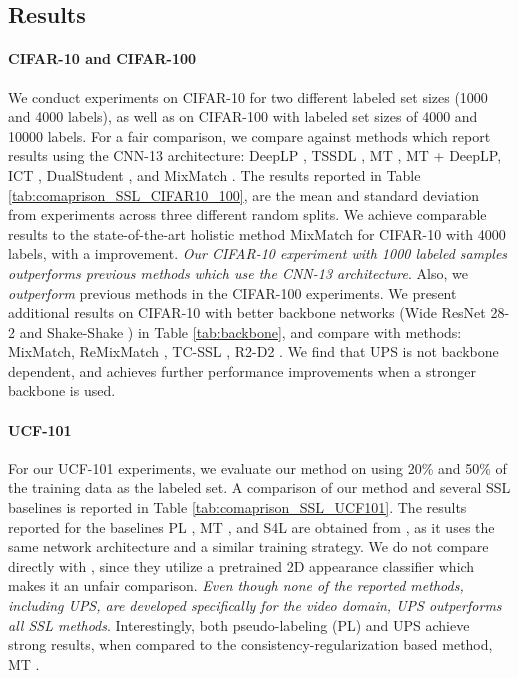 \documentclass{article} \usepackage{iclr2021_conference,times}
\begin{document}
\subsection{Results}

\paragraph{CIFAR-10 and CIFAR-100}
We conduct experiments on CIFAR-10 for two different labeled set sizes (1000 and 4000 labels), as well as on CIFAR-100 with labeled set sizes of 4000 and 10000 labels. For a fair comparison, we compare against methods which report results using the CNN-13 architecture: DeepLP \citep{Iscen2019LabelPF}, TSSDL \citep{Shi_2018_ECCV}, MT \citep{NIPS2017_6719_meanT}, MT + DeepLP, ICT \citep{Verma2019InterpolationCT}, DualStudent \citep{Ke_2019_ICCV}, and MixMatch \citep{NIPS2019_8749_MixMatch}. The results reported in Table \ref{tab:comaprison_SSL_CIFAR10_100}, are the mean and standard deviation from experiments across three different random splits. We achieve comparable results to the state-of-the-art holistic method MixMatch \citep{NIPS2019_8749_MixMatch} for CIFAR-10 with 4000 labels, with a  improvement. {\em Our CIFAR-10 experiment with 1000 labeled samples outperforms previous methods which use the CNN-13 architecture}. Also, we {\em outperform} previous methods in the CIFAR-100 experiments. We present additional results on CIFAR-10 with better backbone networks (Wide ResNet 28-2 \citep{BMVC2016_87} and Shake-Shake \citep{gastaldi2017shake}) in Table \ref{tab:backbone}, and compare with methods: MixMatch, ReMixMatch \citep{Berthelot2020ReMixMatch:}, TC-SSL \citep{zhoutime}, R2-D2 \citep{R2D2_AAAI_2020}. We find that UPS is not backbone dependent, and achieves further performance improvements when a stronger backbone is used.






\paragraph{UCF-101} 
For our UCF-101 experiments, we evaluate our method on using 20\% and 50\% of the training data as the labeled set. A comparison of our method and several SSL baselines is reported in Table \ref{tab:comaprison_SSL_UCF101}. The results reported for the baselines PL \citep{Lee2013PseudoLabelT}, MT \citep{NIPS2017_6719_meanT}, and S4L \citep{zhai2019s4l} are obtained from \citep{jing2020videossl}, as it uses the same network architecture and a similar training strategy. We do not compare directly with \citep{jing2020videossl}, since  they utilize a pretrained 2D appearance classifier which makes it an unfair comparison. {\em Even though none of the reported methods, including UPS, are developed specifically for the video domain, UPS outperforms all SSL methods}. Interestingly, both pseudo-labeling (PL) and UPS achieve strong results, when compared to the consistency-regularization based method, MT \citep{NIPS2017_6719_meanT} .
\end{document}

